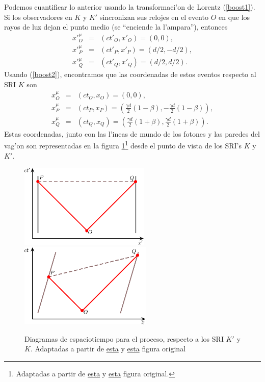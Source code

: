 Podemos cuantificar lo anterior usando la transformaci'on de Lorentz (\ref{boost1}). Si los observadores en $K$ y $K'$ sincronizan sus relojes en el evento $O$ en que los rayos de luz dejan el punto medio (se ``enciende la l'ampara''), entonces
\begin{eqnarray}
x'^\mu_O&=&(ct'_O,x'_O)=(0,0), \\
x'^\mu_P&=&(ct'_P,x'_P)=(d/2,-d/2), \\
x'^\mu_Q&=&(ct'_Q,x'_Q)=(d/2,d/2).
\end{eqnarray}
Usando (\ref{boost2}), encontramos que las coordenadas de estos eventos respecto al SRI $K$ son
\begin{eqnarray}
x^\mu_O&=&(ct_O,x_O)=(0,0), \\
x^\mu_P&=&(ct_P,x_P)=\left(\frac{\gamma d}{2}(1-\beta),-\frac{\gamma d}{2} (1-\beta)\right), \\
x^\mu_Q&=&(ct_Q,x_Q)=\left(\frac{\gamma d}{2}(1+\beta),\frac{\gamma d}{2} (1+\beta)\right).
\end{eqnarray}
Estas coordenadas, junto con las l'ineas de mundo de los fotones y las paredes del vag'on son representadas en la figura \ref{sim03-04}\footnote{Adaptadas a partir de \href{http://commons.wikimedia.org/wiki/File:TrainAndPlatformDiagram1.svg}{esta} y \href{http://commons.wikimedia.org/wiki/File:TrainAndPlatformDiagram2.svg}{esta} figura original.} desde el punto de vista de los SRI's $K$ y $K'$.
\begin{figure}[!h]
\centerline{\includegraphics[height= 4cm]{fig/fig-diagrama_simultaneidad-03.pdf}\hspace{1cm}
\includegraphics[height= 4cm]{fig/fig-diagrama_simultaneidad-04.pdf}}
\caption{Diagramas de espaciotiempo para el proceso, respecto a los SRI $K'$ y $K$. Adaptadas a partir de \href{https://en.wikipedia.org/wiki/File:TrainAndPlatformDiagram1.svg}{esta} y \href{https://en.wikipedia.org/wiki/File:TrainAndPlatformDiagram2.svg}{esta} figura original}
\label{sim03-04}
\end{figure}

